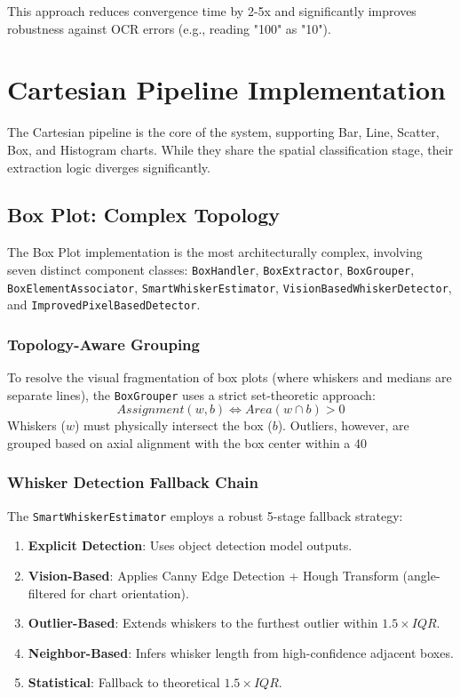 \documentclass[11pt, a4paper]{report}
\begin{document}
This approach reduces convergence time by 2-5x and significantly improves robustness against OCR errors (e.g., reading "100" as "10").

\chapter{Cartesian Pipeline Implementation}

The Cartesian pipeline is the core of the system, supporting Bar, Line, Scatter, Box, and Histogram charts. While they share the spatial classification stage, their extraction logic diverges significantly.

\section{Box Plot: Complex Topology}
The Box Plot implementation is the most architecturally complex, involving seven distinct component classes: \texttt{BoxHandler}, \texttt{BoxExtractor}, \texttt{BoxGrouper}, \texttt{BoxElementAssociator}, \texttt{SmartWhiskerEstimator}, \texttt{VisionBasedWhiskerDetector}, and \texttt{ImprovedPixelBasedDetector}.

\subsection{Topology-Aware Grouping}
To resolve the visual fragmentation of box plots (where whiskers and medians are separate lines), the \texttt{BoxGrouper} uses a strict set-theoretic approach:
\begin{equation}
    Assignment(w, b) \iff Area(w \cap b) > 0
\end{equation}
Whiskers ($w$) must physically intersect the box ($b$). Outliers, however, are grouped based on axial alignment with the box center within a 40%

\subsection{Whisker Detection Fallback Chain}
The \texttt{SmartWhiskerEstimator} employs a robust 5-stage fallback strategy:
\begin{enumerate}
    \item \textbf{Explicit Detection}: Uses object detection model outputs.
    \item \textbf{Vision-Based}: Applies Canny Edge Detection + Hough Transform (angle-filtered for chart orientation).
    \item \textbf{Outlier-Based}: Extends whiskers to the furthest outlier within $1.5 \times IQR$.
    \item \textbf{Neighbor-Based}: Infers whisker length from high-confidence adjacent boxes.
    \item \textbf{Statistical}: Fallback to theoretical $1.5 \times IQR$.
\end{enumerate}
\end{document}
